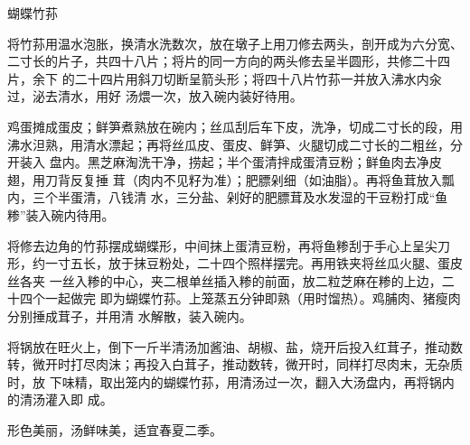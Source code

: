 \begin{recipe}{蝴蝶竹荪}

\ingredients


\preparation

\step 将竹荪用温水泡胀，换清水洗数次，放在墩子上用刀修去两头，剖开成为六分宽、
二寸长的片子，共四十八片；将片的同一方向的两头修去呈半圆形，共修二十四片，余下
的二十四片用斜刀切断呈箭头形；将四十八片竹荪一并放入沸水内汆过，泌去清水，用好
汤煨一次，放入碗内装好待用。

\step 鸡蛋摊成蛋皮；鲜笋煮熟放在碗内；丝瓜刮后车下皮，洗净，切成二寸长的段，用
沸水泹熟，用清水漂起；再将丝瓜皮、蛋皮、鲜笋、火腿切成二寸长的二粗丝，分开装入
盘内。黑芝麻淘洗干净，捞起；半个蛋清拌成蛋清豆粉；鲜鱼肉去净皮翅，用刀背反复捶
茸（肉内不见籽为准）；肥膘剁细（如油脂）。再将鱼茸放入瓢内，三个半蛋清，八钱清
水，三分盐、剁好的肥膘茸及水发湿的干豆粉打成“鱼糁”装入碗内待用。

\step 将修去边角的竹荪摆成蝴蝶形，中间抹上蛋清豆粉，再将鱼糁刮于手心上呈尖刀
形，约一寸五长，放于抹豆粉处，二十四个照样摆完。再用铁夹将丝瓜火腿、蛋皮丝各夹
一丝入糁的中心，夹二根单丝插入糁的前面，放二粒芝麻在糁的上边，二十四个一起做完
即为蝴蝶竹荪。上笼蒸五分钟即熟（用时馏热）。鸡脯肉、猪瘦肉分别捶成茸子，并用清
水解散，装入碗内。

\step 将锅放在旺火上，倒下一斤半清汤加酱油、胡椒、盐，烧开后投入红茸子，推动数
转，微开时打尽肉沫；再投入白茸子，推动数转，微开时，同样打尽肉末，无杂质时，放
下味精，取出笼内的蝴蝶竹荪，用清汤过一次，翻入大汤盘内，再将锅内的清汤灌入即
成。

\features

形色美丽，汤鲜味美，适宜春夏二季。

\end{recipe}

